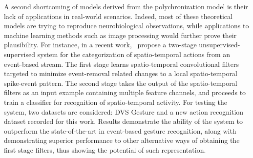 \documentclass[brainsci, %
               review,submit,pdftex,moreauthors
               ]{Definitions/mdpi}
\begin{document}
A second shortcoming of models derived from the polychronization model is their lack of applications in real-world scenarios. Indeed, most of these theoretical models are trying to reproduce neurobiological observations, while applications to machine learning methods such as image processing would further prove their plausibility. For instance, in a recent work,~\citet{ghosh_spatiotemporal_2019} propose a two-stage unsupervised-supervised system for the categorization of spatio-temporal actions from an event-based stream. The first stage learns spatio-temporal convolutional filters targeted to minimize event-removal related changes to a local spatio-temporal spike-event pattern. The second stage takes the output of the spatio-temporal filters as an input example containing multiple feature channels, and proceeds to train a classifier for recognition of spatio-temporal activity. For testing the system, two datasets are considered: DVS Gesture and a new action recognition dataset recorded for this work. Results demonstrate the ability of the system to outperform the state-of-the-art in event-based gesture recognition, along with demonstrating superior performance to other alternative ways of obtaining the first stage filters, thus showing the potential of such representation. 
\end{document}
